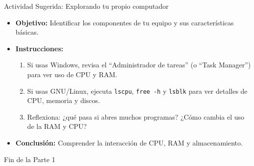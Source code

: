 \documentclass[10pt]{beamer}
\begin{document}
\begin{frame}{Actividad Sugerida: Explorando tu propio computador}
\begin{itemize}
    \item \textbf{Objetivo:} Identificar los componentes de tu equipo y sus características básicas.
    \item \textbf{Instrucciones:}
    \begin{enumerate}
        \item Si usas Windows, revisa el “Administrador de tareas” (o “Task Manager”) para ver uso de CPU y RAM.
        \item Si usas GNU/Linux, ejecuta \texttt{lscpu}, \texttt{free -h} y \texttt{lsblk} para ver detalles de CPU, memoria y discos.
        \item Reflexiona: ¿qué pasa si abres muchos programas? ¿Cómo cambia el uso de la RAM y CPU?
    \end{enumerate}
    \item \textbf{Conclusión:} Comprender la interacción de CPU, RAM y almacenamiento.
\end{itemize}
\end{frame}

\begin{frame}
\Huge{\centerline{Fin de la Parte 1}}
\end{frame}
\end{document}
